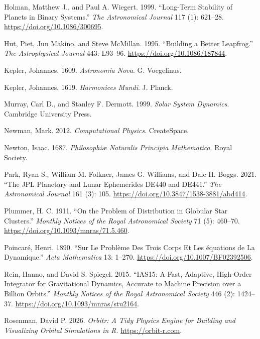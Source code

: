\documentclass[
  10.5pt,
  letterpaper,
]{scrbook}
\newlength{\cslhangindent}
\newenvironment{CSLReferences}[2] %
 {\begin{list}{}{%
  \setlength{\itemindent}{0pt}
  \setlength{\leftmargin}{0pt}
  \setlength{\parsep}{0pt}
  \ifodd #1
   \setlength{\leftmargin}{\cslhangindent}
   \setlength{\itemindent}{-1\cslhangindent}
  \fi
  \setlength{\itemsep}{#2\baselineskip}}}
 {\end{list}}
\theoremstyle{plain}
\theoremstyle{remark}
\begin{document}
\begin{CSLReferences}{1}{1}
Holman, Matthew J., and Paul A. Wiegert. 1999. {``Long-Term Stability of
Planets in Binary Systems.''} \emph{The Astronomical Journal} 117 (1):
621--28. \url{https://doi.org/10.1086/300695}.

Hut, Piet, Jun Makino, and Steve McMillan. 1995. {``Building a Better
Leapfrog.''} \emph{The Astrophysical Journal} 443: L93--96.
\url{https://doi.org/10.1086/187844}.

Kepler, Johannes. 1609. \emph{Astronomia Nova}. G. Voegelinus.

Kepler, Johannes. 1619. \emph{Harmonices Mundi}. J. Planck.

Murray, Carl D., and Stanley F. Dermott. 1999. \emph{Solar System
Dynamics}. Cambridge University Press.

Newman, Mark. 2012. \emph{Computational Physics}. CreateSpace.

Newton, Isaac. 1687. \emph{Philosophi{æ} Naturalis Principia
Mathematica}. Royal Society.

Park, Ryan S., William M. Folkner, James G. Williams, and Dale H. Boggs.
2021. {``The {JPL} Planetary and Lunar Ephemerides {DE440} and
{DE441}.''} \emph{The Astronomical Journal} 161 (3): 105.
\url{https://doi.org/10.3847/1538-3881/abd414}.

Plummer, H. C. 1911. {``On the Problem of Distribution in Globular Star
Clusters.''} \emph{Monthly Notices of the Royal Astronomical Society} 71
(5): 460--70. \url{https://doi.org/10.1093/mnras/71.5.460}.

Poincaré, Henri. 1890. {``Sur Le Probl{è}me Des Trois Corps Et Les
{é}quations de La Dynamique.''} \emph{Acta Mathematica} 13: 1--270.
\url{https://doi.org/10.1007/BF02392506}.

Rein, Hanno, and David S. Spiegel. 2015. {``{IAS15}: A Fast, Adaptive,
High-Order Integrator for Gravitational Dynamics, Accurate to Machine
Precision over a Billion Orbits.''} \emph{Monthly Notices of the Royal
Astronomical Society} 446 (2): 1424--37.
\url{https://doi.org/10.1093/mnras/stu2164}.

Rosenman, David P. 2026. \emph{Orbitr: A Tidy Physics Engine for
Building and Visualizing Orbital Simulations in {R}}.
\url{https://orbit-r.com}.


\end{CSLReferences}
\end{document}
